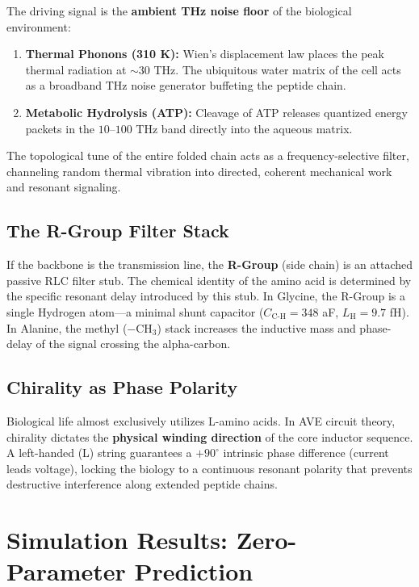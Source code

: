 The driving signal is the \textbf{ambient THz noise floor} of the biological environment:
\begin{enumerate}
    \item \textbf{Thermal Phonons (310 K):} Wien's displacement law places the peak thermal radiation at $\sim 30$ THz. The ubiquitous water matrix of the cell acts as a broadband THz noise generator buffeting the peptide chain.
    \item \textbf{Metabolic Hydrolysis (ATP):} Cleavage of ATP releases quantized energy packets in the $10$--$100$ THz band directly into the aqueous matrix.
\end{enumerate}
The topological tune of the entire folded chain acts as a frequency-selective filter, channeling random thermal vibration into directed, coherent mechanical work and resonant signaling.

\subsection{The R-Group Filter Stack}

If the backbone is the transmission line, the \textbf{R-Group} (side chain) is an attached passive RLC filter stub. The chemical identity of the amino acid is determined by the specific resonant delay introduced by this stub. In Glycine, the R-Group is a single Hydrogen atom---a minimal shunt capacitor ($C_\text{C-H} = 348$ aF, $L_\text{H} = 9.7$ fH). In Alanine, the methyl ($-\text{CH}_3$) stack increases the inductive mass and phase-delay of the signal crossing the alpha-carbon.

\subsection{Chirality as Phase Polarity}

Biological life almost exclusively utilizes L-amino acids. In AVE circuit theory, chirality dictates the \textbf{physical winding direction} of the core inductor sequence. A left-handed (L) string guarantees a $+90^\circ$ intrinsic phase difference (current leads voltage), locking the biology to a continuous resonant polarity that prevents destructive interference along extended peptide chains.

\section{Simulation Results: Zero-Parameter Prediction}

